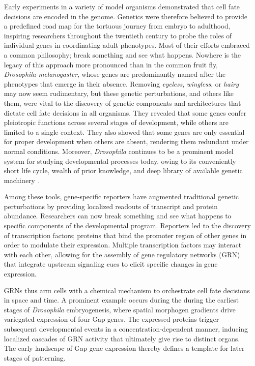 Early experiments in a variety of model organisms demonstrated that cell fate decisions are encoded in the genome. Genetics were therefore believed to provide a predefined road map for the tortuous journey from embryo to adulthood, inspiring researchers throughout the twentieth century to probe the roles of individual genes in coordinating adult phenotypes. Most of their efforts embraced a common philosophy; break something and see what happens. Nowhere is the legacy of this approach more pronounced than in the common fruit fly, \textit{Drosophila melanogaster}, whose genes are predominantly named after the phenotypes that emerge in their absence. Removing \textit{eyeless}, \textit{wingless}, or \textit{hairy} may now seem rudimentary, but these genetic perturbations, and others like them, were vital to the discovery of genetic components and architectures that dictate cell fate decisions in all organisms. They revealed that some genes confer pleiotropic functions across several stages of development, while others are limited to a single context. They also showed that some genes are only essential for proper development when others are absent, rendering them redundant under normal conditions. Moreover, \emph{Drosophila} continues to be a prominent model system for studying developmental processes today, owing to its conveniently short life cycle, wealth of prior knowledge, and deep library of available genetic machinery \cite{Beira2016,Enomoto2018,Germani2018}.

Among these tools, gene-specific reporters have augmented traditional genetic perturbations by providing localized readouts of transcript and protein abundance. Researchers can now break something and see what happens to specific components of the developmental program. Reporters led to the discovery of transcription factors; proteins that bind the promoter region of other genes in order to modulate their expression. Multiple transcription factors may interact with each other, allowing for the assembly of gene regulatory networks (GRN) that integrate upstream signaling cues to elicit specific changes in gene expression. 

GRNs thus arm cells with a chemical mechanism to orchestrate cell fate decisions in space and time. A prominent example occurs during the during the earliest stages of \textit{Drosophila} embryogenesis, where spatial morphogen gradients drive variegated expression of four Gap genes. The expressed proteins trigger subsequent developmental events in a concentration-dependent manner, inducing localized cascades of GRN activity that ultimately give rise to distinct organs. The early landscape of Gap gene expression thereby defines a template for later stages of patterning.

